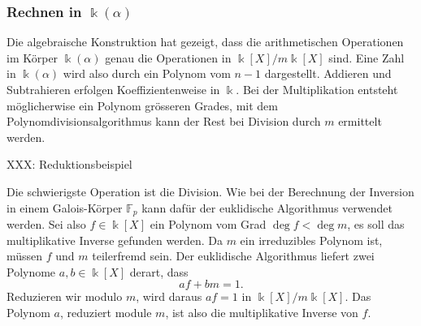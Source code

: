 \subsubsection{Rechnen in $\Bbbk(\alpha)$}
Die algebraische Konstruktion hat gezeigt, dass die arithmetischen
Operationen im Körper $\Bbbk(\alpha)$ genau die Operationen 
in $\Bbbk[X]/m\Bbbk[X]$ sind.
Eine Zahl in $\Bbbk(\alpha)$ wird also durch ein Polynom vom 
$n-1$ dargestellt.
Addieren und Subtrahieren erfolgen Koeffizientenweise in $\Bbbk$.
Bei der Multiplikation entsteht möglicherwise ein Polynom grösseren
Grades, mit dem Polynomdivisionsalgorithmus kann der Rest bei Division
durch $m$ ermittelt werden.

\begin{beispiel}
XXX: Reduktionsbeispiel
\end{beispiel}

Die schwierigste Operation ist die Division.
Wie bei der Berechnung der Inversion in einem Galois-Körper $\mathbb{F}_p$
kann dafür der euklidische Algorithmus verwendet werden.
Sei also $f\in\Bbbk[X]$ ein Polynom vom Grad $\deg f <\deg m$, es soll
das multiplikative Inverse gefunden werden.
Da $m$ ein irreduzibles Polynom ist, müssen $f$ und $m$ teilerfremd sein.
Der euklidische Algorithmus liefert zwei Polynome $a,b\in\Bbbk[X]$ derart,
dass
\[
af+bm=1.
\]
Reduzieren wir modulo $m$, wird daraus $af=1$ in $\Bbbk[X]/m\Bbbk[X]$.
Das Polynom $a$, reduziert module $m$, ist also die multiplikative
Inverse von $f$.

